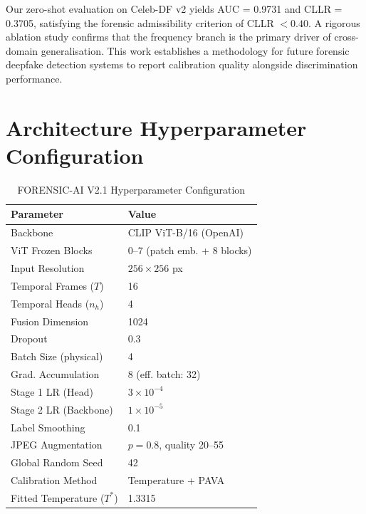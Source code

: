 \documentclass[journal]{IEEEtran}
\begin{document}
Our zero-shot evaluation on Celeb-DF v2 yields AUC = 0.9731 and CLLR = 0.3705, satisfying the forensic admissibility criterion of CLLR $< 0.40$. A rigorous ablation study confirms that the frequency branch is the primary driver of cross-domain generalisation. This work establishes a methodology for future forensic deepfake detection systems to report calibration quality alongside discrimination performance.

\appendices

\section{Architecture Hyperparameter Configuration}
\label{app:config}

\begin{table}[!h]
\renewcommand{\arraystretch}{1.3}
\caption{FORENSIC-AI V2.1 Hyperparameter Configuration}
\label{tab:config}
\centering
\begin{tabular}{ll}
\toprule
\textbf{Parameter} & \textbf{Value} \\
\midrule
Backbone            & CLIP ViT-B/16 (OpenAI) \\
ViT Frozen Blocks   & 0--7 (patch emb. + 8 blocks) \\
Input Resolution    & $256 \times 256$ px \\
Temporal Frames ($T$) & 16 \\
Temporal Heads ($n_h$) & 4 \\
Fusion Dimension    & 1024 \\
Dropout             & 0.3 \\
Batch Size (physical) & 4 \\
Grad. Accumulation  & 8 (eff. batch: 32) \\
Stage 1 LR (Head)   & $3 \times 10^{-4}$ \\
Stage 2 LR (Backbone) & $1 \times 10^{-5}$ \\
Label Smoothing     & 0.1 \\
JPEG Augmentation   & $p=0.8$, quality 20--55 \\
Global Random Seed  & 42 \\
Calibration Method  & Temperature + PAVA \\
Fitted Temperature ($T^*$) & 1.3315 \\
\bottomrule
\end{tabular}
\end{table}
\end{document}
